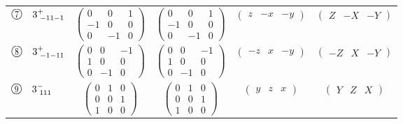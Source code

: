 \documentclass[fleqn,10pt,landscape]{jsarticle}
\begin{document}
\begin{center}
\begin{longtable}{lcccc}
$ {\ooalign{\hfil\resizebox{.8\width}{\height}{7}\hfil\crcr\raise.1ex\hbox{\large$\bigcirc$}}}\quad 3^{+}_{\,\,-11-1} $ & $ \begin{pmatrix} 0 & 0 & 1 \\ -1 & 0 & 0 \\ 0 & -1 & 0 \end{pmatrix} $ & $ \begin{pmatrix} 0 & 0 & 1 \\ -1 & 0 & 0 \\ 0 & -1 & 0 \end{pmatrix} $ & $ \begin{pmatrix} z & - x & - y \end{pmatrix} $ & $ \begin{pmatrix} Z & - X & - Y \end{pmatrix} $ \\
$ {\ooalign{\hfil\resizebox{.8\width}{\height}{8}\hfil\crcr\raise.1ex\hbox{\large$\bigcirc$}}}\quad 3^{+}_{\,\,-1-11} $ & $ \begin{pmatrix} 0 & 0 & -1 \\ 1 & 0 & 0 \\ 0 & -1 & 0 \end{pmatrix} $ & $ \begin{pmatrix} 0 & 0 & -1 \\ 1 & 0 & 0 \\ 0 & -1 & 0 \end{pmatrix} $ & $ \begin{pmatrix} - z & x & - y \end{pmatrix} $ & $ \begin{pmatrix} - Z & X & - Y \end{pmatrix} $ \\
$ {\ooalign{\hfil\resizebox{.8\width}{\height}{9}\hfil\crcr\raise.1ex\hbox{\large$\bigcirc$}}}\quad 3^{-}_{\,\,111} $ & $ \begin{pmatrix} 0 & 1 & 0 \\ 0 & 0 & 1 \\ 1 & 0 & 0 \end{pmatrix} $ & $ \begin{pmatrix} 0 & 1 & 0 \\ 0 & 0 & 1 \\ 1 & 0 & 0 \end{pmatrix} $ & $ \begin{pmatrix} y & z & x \end{pmatrix} $ & $ \begin{pmatrix} Y & Z & X \end{pmatrix} $ \\

\end{longtable}
\end{center}
\end{document}
